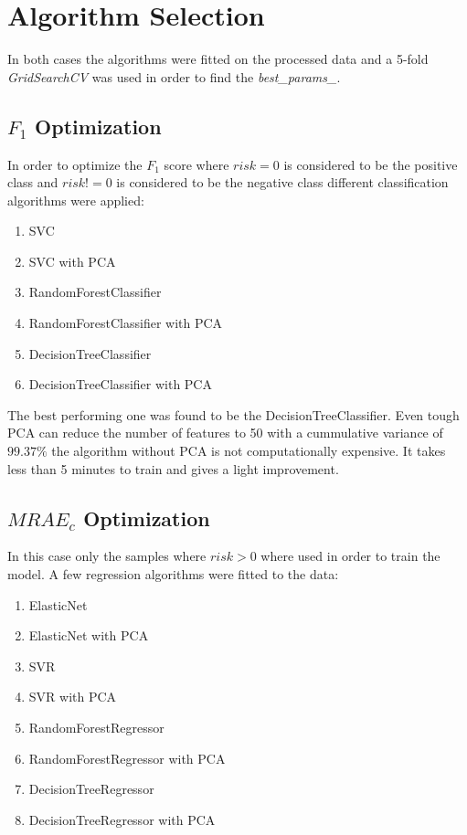 \documentclass[a4paper]{article}
\begin{document}
\section{Algorithm Selection}
\label{sec:algo_selection}

In both cases the algorithms were fitted on the processed data and a 5-fold \textit{GridSearchCV} was used in order to find the \textit{best\_params\_}.

\subsection{$F_1$ Optimization}
In order to optimize the $F_1$ score where $\mathit{risk}=0$ is considered to be the positive class and $\mathit{risk} != 0$ is considered to be the negative class different classification algorithms were applied:

\begin{enumerate}
\item SVC
\item SVC with PCA
\item RandomForestClassifier 
\item RandomForestClassifier with PCA
\item DecisionTreeClassifier
\item DecisionTreeClassifier with PCA
\end{enumerate}

The best performing one was found to be the DecisionTreeClassifier. Even tough PCA can reduce the number of features to 50 with a cummulative variance of $99.37\%$ the algorithm without PCA is not computationally expensive. It takes less than 5 minutes to train and gives a light improvement.

\subsection{$\mathit{MRAE_c}$ Optimization}
In this case only the samples where $\mathit{risk} > 0$ where used in order to train the model. A few regression algorithms were fitted to the data:

\begin{enumerate}
\item ElasticNet
\item ElasticNet with PCA
\item SVR
\item SVR with PCA
\item RandomForestRegressor 
\item RandomForestRegressor with PCA
\item DecisionTreeRegressor 
\item DecisionTreeRegressor with PCA
\end{enumerate}
\end{document}
